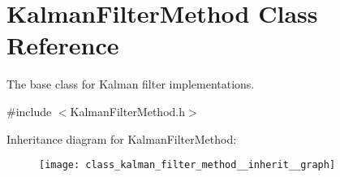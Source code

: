 \hypertarget{class_kalman_filter_method}{\section{\-Kalman\-Filter\-Method \-Class \-Reference}
\label{class_kalman_filter_method}
}


\-The base class for \-Kalman filter implementations.  




{\ttfamily \#include $<$\-Kalman\-Filter\-Method.\-h$>$}



\-Inheritance diagram for \-Kalman\-Filter\-Method\-:
\nopagebreak
\begin{figure}[H]
\begin{center}
\leavevmode
\texttt{[image: class\_kalman\_filter\_method\_\_inherit\_\_graph]}
\end{center}
\end{figure}
